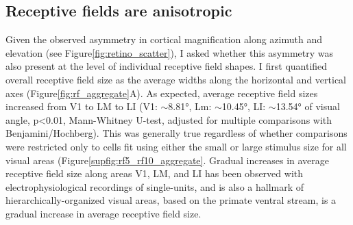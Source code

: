 \subsection{Receptive fields are anisotropic}
Given the observed asymmetry in cortical magnification along azimuth and elevation (see Figure\ref{fig:retino_scatter}), I asked whether this asymmetry was also present at the level of individual receptive field shapes. I first quantified overall receptive field size as the average widths along the horizontal and vertical axes (Figure\ref{fig:rf_aggregate}A). As expected, average receptive field sizes increased from V1 to LM to LI (V1: $\sim$\ang{8.81}, Lm: $\sim$\ang{10.45}, LI: $\sim$\ang{13.54} of visual angle, p<0.01, Mann-Whitney U-test, adjusted for multiple comparisons with Benjamini/Hochberg). This was generally true regardless of whether comparisons were restricted only to cells fit using either the small or large stimulus size for all visual areas (Figure\ref{supfig:rf5_rf10_aggregate}. Gradual increases in average receptive field size along areas V1, LM, and LI has been observed with electrophysiological recordings of single-units\cite{Vermaercke2014, Tafazoli2017}, and is also a hallmark of hierarchically-organized visual areas, based on the primate ventral stream, is a gradual increase in average receptive field size\cite{Rust2010SelectivityIT, Vermaercke2014, Siegle2021, Tafazoli2017}.


